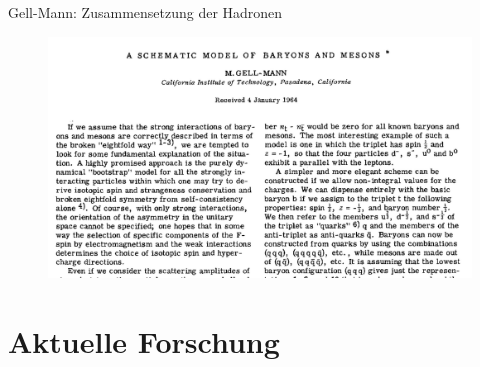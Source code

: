 \documentclass[aspectratio=169]{beamer} %
\begin{document}
              \begin{frame}{Gell-Mann: Zusammensetzung der Hadronen}
                \begin{figure}\includegraphics[height=0.85\textheight, width=\textwidth, keepaspectratio]{Images/8ad56d13-e301-4a37-be9c-7077ac16ce16.jpg}\\\small\cite[S.~214]{GellMann.1964}\end{figure}
    \end{frame}

    \section[Die Suche nach Pentaquarks]{Aktuelle Forschung}
\end{document}
